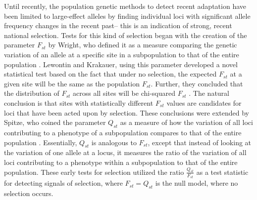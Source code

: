 \documentclass[a4paper,12pt]{article}
\begin{document}

Until recently, the population genetic methods to detect recent adaptation have been limited to
large-effect alleles by finding individual loci with significant
allele frequency changes in the recent past-- this is an indication of
strong, recent national selection. Tests for this kind of selection
began with the creation of the parameter $F_{st}$ by Wright, who
defined it as a measure comparing
the genetic variation of an allele at a specific site in a subpopulation to that of the entire population
\cite{Fst}. Lewontin and Krakauer, using this parameter developed a
novel statistical test based on the fact
that under no selection, the expected $F_{st}$ at a given site will be the same
as the population $F_{st}$. Further, they concluded that the
distribution of $F_{st}$ across all sites will be chi-squared
$F_{st}$ \cite{firstseltest}. The natural conclusion is that sites
with statistically different $F_{st}$ values are candidates for loci
that have been acted upon by selection. These conclusions were extended by Spitze, who coined the
parameter $Q_{st}$ as a measure of how the variation of all loci
contributing to a phenotype of a subpopulation compares to that of the entire
population \cite{Qst}. Essentially, $Q_{st}$ is analogous to $F_{st}$,
except that instead of looking at the variation of one allele at a
locus, it measures the ratio of the variation of all loci contributing to a
phenotype within a subpopulation to that of the entire population. These early tests for selection utilized the ratio
$\frac{Q_{st}}{F_{st}}$ as a test statistic for detecting signals of
selection, where $F_{st} = Q_{st}$ is the null model, where no
selection occurs.
\end{document}
